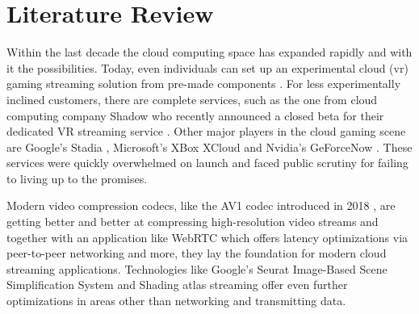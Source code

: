\section{Literature Review}
\label{sec:lit}

Within the last decade the cloud computing space has expanded rapidly and with it the possibilities. Today, even individuals can set up an experimental cloud (\acrfull{vr}) gaming streaming solution from pre-made components \parencite{tayoexe} \parencite{clouddesktopguide}. For less experimentally inclined customers, there are complete services, such as the one from cloud computing company Shadow \parencite{shadow} who recently announced a closed beta for their dedicated VR streaming service \parencite{shadowvr}. Other major players in the cloud gaming  scene are Google's Stadia \parencite{stadia}, Microsoft's XBox XCloud \parencite{xcloud} and Nvidia's GeForceNow \parencite{geforcenow}. These services were quickly overwhelmed on launch and faced public scrutiny for failing to living up to the promises. 

Modern video compression codecs, like the AV1 codec introduced in 2018 \parencite{av1}, are getting better and better at compressing high-resolution video streams and together with an application like WebRTC \parencite{webRTC} which offers latency optimizations via peer-to-peer networking and more, they lay the foundation for modern cloud streaming applications. Technologies like Google's Seurat Image\hyp{}Based Scene Simplification System \parencite{seurat} and Shading atlas streaming \parencite{sas} offer even further optimizations in areas other than networking and transmitting data. 

